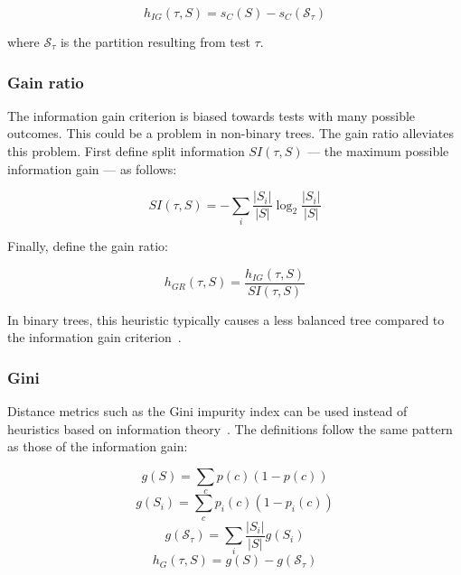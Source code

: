 \begin{equation}
    h_{IG}(\tau, S) = s_C(S) - s_C(\mathcal{S}_\tau)
\end{equation}

where $\mathcal{S}_\tau$ is the partition resulting from test $\tau$.

\subsubsection{Gain ratio}
The information gain criterion is biased towards tests with many possible outcomes. This could be a problem in non-binary trees. The gain ratio alleviates this problem. First define split information $SI(\tau, S)$ --- the maximum possible information gain --- as follows:

\begin{equation}
    SI(\tau, S) = - \sum_i \frac{|S_i|}{|S|} \log_2 \frac{|S_i|}{|S|}
\end{equation}

Finally, define the gain ratio:

\begin{equation}
    h_{GR}(\tau, S) = \frac{h_{IG}(\tau, S)}{SI(\tau, S)}
\end{equation}

In binary trees, this heuristic typically causes a less balanced tree compared to the information gain criterion~\cite{c45}.

\subsubsection{Gini}
Distance metrics such as the Gini impurity index can be used instead of heuristics based on information theory~\cite{cart}. The definitions follow the same pattern as those of the information gain:

\begin{equation}
    g(S) = \sum_c p(c)(1 - p(c))
\end{equation}
\begin{equation}
    g(S_i) = \sum_c p_i(c)(1-p_i(c))
\end{equation}
\begin{equation}
    g(\mathcal{S}_\tau) = \sum_i \frac{|S_i|}{|S|} g(S_i)
\end{equation}
\begin{equation}
    h_G(\tau, S) = g(S) - g(\mathcal{S}_\tau)
\end{equation}

